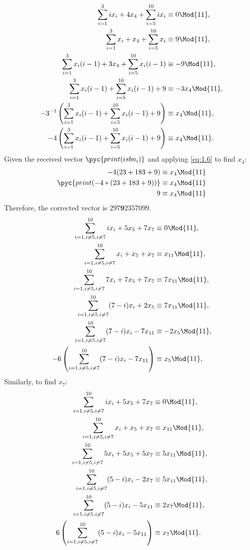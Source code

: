 \qsubpart
\begin{align}
\label{eq:1.6}
	\sum_{i=1}^{3}ix_i + 4x_4+\sum_{i=5}^{10} ix_i &\equiv 0 \Mod{11}\nonumber,\\
	\sum_{i=1}^{3}x_i + x_4+\sum_{i=5}^{10} x_i &\equiv 9 \Mod{11}\nonumber,\\
	\sum_{i=1}^{3}x_i(i-1) + 3x_4+\sum_{i=5}^{10} x_i(i-1) &\equiv -9 \Mod{11}\nonumber,\\
	\sum_{i=1}^{3}x_i(i-1) +\sum_{i=5}^{10} x_i(i-1) +9 &\equiv -3x_4 \Mod{11}\nonumber,\\
	-3^{-1}\left(\sum_{i=1}^{3}x_i(i-1)+\sum_{i=5}^{10} x_i(i-1) +9\right) &\equiv x_4 \Mod{11}\nonumber,\\
	-4\left(\sum_{i=1}^{3}x_i(i-1) +\sum_{i=5}^{10} x_i(i-1) +9\right) &\equiv x_4 \Mod{11}.
\end{align}
Given the received vector $\pyc{print(isbn_i)}$ and applying \eqref{eq:1.6} to find $x_4$:
\begin{align*}
	-4(23 + 183 + 9) \equiv x_4 \Mod{11}\\
	\pyc{print(-4*(23 + 183 + 9))}\equiv x_4 \Mod{11}\\
	9\equiv x_4 \Mod{11}\\
\end{align*}
Therefore, the corrected vector is $297\textbf{9}2357099$.
\qsubpart
\begin{align}
\label{eq:1.7}
	\sum_{\substack{i=1, i\neq5, i\neq7}}^{10}ix_i +5x_5 + 7x_7 &\equiv 0 \Mod{11},\nonumber\\
	\sum_{\substack{i=1, i\neq5, i\neq7}}^{10}x_i  + x_5 +  x_7 &\equiv x_{11} \Mod{11},\nonumber\\
	\sum_{\substack{i=1, i\neq5, i\neq7}}^{10}7x_i  + 7x_5 + 7 x_7 &\equiv 7x_{11} \Mod{11},\nonumber\\
	\sum_{\substack{i=1, i\neq5, i\neq7}}^{10}(7-i)x_i + 2x_5 &\equiv 7x_{11} \Mod{11},\nonumber\\
	\sum_{\substack{i=1, i\neq5, i\neq7}}^{10}(7-i)x_i- 7x_{11} &\equiv -2x_5  \Mod{11},\nonumber\\
	-6\left(\sum_{\substack{i=1, i\neq5, i\neq7}}^{10}(7-i)x_i- 7x_{11}\right) &\equiv x_5  \Mod{11},\nonumber\\
\end{align}
Similarly, to find $x_7$:
\begin{align}
\label{eq:1.8}
	\sum_{\substack{i=1, i\neq5, i\neq7}}^{10}ix_i +5x_5 + 7x_7 &\equiv 0 \Mod{11},\nonumber\\
	\sum_{\substack{i=1, i\neq5, i\neq7}}^{10}x_i  + x_5 +  x_7 &\equiv x_{11} \Mod{11},\nonumber\\
	\sum_{\substack{i=1, i\neq5, i\neq7}}^{10}5x_i  + 5x_5 + 5 x_7 &\equiv 5x_{11} \Mod{11},\nonumber\\
	\sum_{\substack{i=1, i\neq5, i\neq7}}^{10}(5-i)x_i - 2x_7 &\equiv 5x_{11} \Mod{11},\nonumber\\
	\sum_{\substack{i=1, i\neq5, i\neq7}}^{10}(5-i)x_i - 5x_{11} &\equiv 2x_{7} \Mod{11},\nonumber\\
	6\left(\sum_{\substack{i=1, i\neq5, i\neq7}}^{10}(5-i)x_i - 5x_{11}\right) &\equiv x_{7} \Mod{11}.
\end{align}

